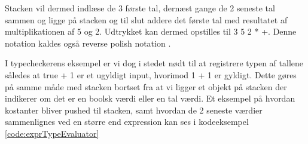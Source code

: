 Stacken vil dermed indlæse de 3 første tal, dernæst gange de 2 seneste tal sammen og ligge på stacken og til slut addere det første tal med resultatet af multiplikationen af 5 og 2. Udtrykket kan dermed opstilles til 3 5 2 * +. Denne notation kaldes også reverse polish notation \cite{CraftingCompiler_2009}.

I typecheckerens eksempel er vi dog i stedet nødt til at registrere typen af tallene således at true + 1 er et ugyldigt input, hvorimod 1 + 1 er gyldigt. Dette gøres på samme måde med stacken bortset fra at vi ligger et objekt på stacken der indikerer om det er en boolsk værdi eller en tal værdi. Et eksempel på hvordan kostanter bliver pushed til stacken, samt hvordan de 2 seneste værdier sammenlignes ved en større end expression kan ses i kodeeksempel \ref{code:exprTypeEvaluator}



